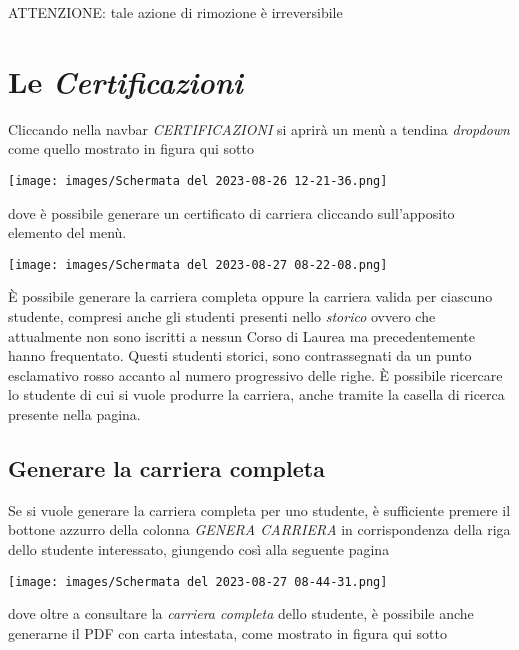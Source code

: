 \documentclass{article}
\newcommand{\alert}[0]{\textcolor{red}{\faExclamationCircle}}
\begin{document}
    \alert ATTENZIONE: tale azione di rimozione è irreversibile

    \pagebreak

    \section{Le \textit{Certificazioni}}

    Cliccando nella navbar \textit{CERTIFICAZIONI} si aprirà un menù a tendina \textit{dropdown} come quello mostrato in figura qui sotto
    \begin{center}
        \texttt{[image: images/Schermata del 2023-08-26 12-21-36.png]}
    \end{center}
    dove è possibile generare un certificato di carriera cliccando sull'apposito elemento del menù.

    \begin{center}
        \texttt{[image: images/Schermata del 2023-08-27 08-22-08.png]}
    \end{center}

    È possibile generare la carriera completa oppure la carriera valida per ciascuno studente, compresi anche gli studenti presenti nello \textit{storico} ovvero che attualmente non sono iscritti a nessun Corso di Laurea ma precedentemente hanno frequentato. Questi studenti storici, sono contrassegnati da un punto esclamativo rosso accanto al numero progressivo delle righe.
    È possibile ricercare lo studente di cui si vuole produrre la carriera, anche tramite la casella di ricerca presente nella pagina.

    \pagebreak

    \subsection{Generare la carriera completa}
    Se si vuole generare la carriera completa per uno studente, è sufficiente premere il bottone azzurro della colonna \textit{GENERA CARRIERA} in corrispondenza della riga dello studente interessato, giungendo così alla seguente pagina

    \begin{center}
        \texttt{[image: images/Schermata del 2023-08-27 08-44-31.png]}
    \end{center}

    dove oltre a consultare la \textit{carriera completa} dello studente, è possibile anche generarne il PDF con carta intestata, come mostrato in figura qui sotto
\end{document}
